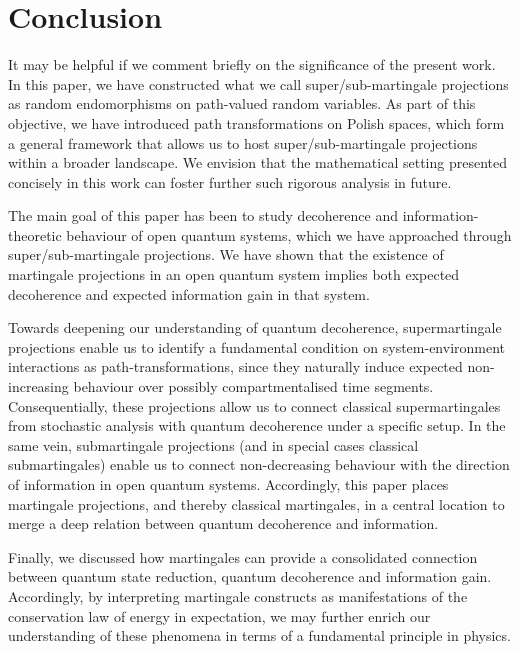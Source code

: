 \documentclass[12pt,a4paper]{article}
\begin{document}
\section{Conclusion}
It may be helpful if we comment briefly on the significance of the present work. In this paper, we have constructed what we call super/sub-martingale projections as random endomorphisms on path-valued random variables. As part of this objective, we have introduced path transformations on Polish spaces, which form a general framework that allows us to host super/sub-martingale projections within a broader landscape. We envision that the mathematical setting presented concisely in this work can foster further such rigorous analysis in future.

The main goal of this paper has been to study decoherence and information-theoretic behaviour of open quantum systems, which we have approached through super/sub-martingale projections. We have shown that the existence of martingale projections in an open quantum system implies both expected decoherence and expected information gain in that system. 

Towards deepening our understanding of quantum decoherence, supermartingale projections enable us to identify a fundamental condition on system-environment interactions as path-transformations, since they naturally induce expected non-increasing behaviour over possibly compartmentalised time segments. Consequentially, these projections allow us to connect classical supermartingales from stochastic analysis with quantum decoherence under a specific setup. In the same vein, submartingale projections (and in special cases classical submartingales) enable us to connect non-decreasing behaviour with the direction of information in open quantum systems. Accordingly, this paper places martingale projections, and thereby classical martingales, in a central location to merge a deep relation between quantum decoherence and information.

Finally, we discussed how martingales can provide a consolidated connection between quantum state reduction, quantum decoherence and information gain. Accordingly, by interpreting martingale constructs as manifestations of the conservation law of energy in expectation, we may further enrich our understanding of these phenomena in terms of a fundamental principle in physics.

\appendix
\end{document}

